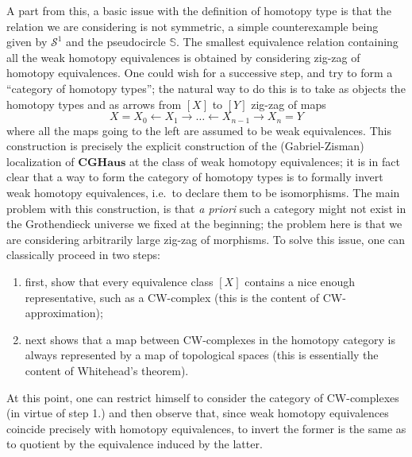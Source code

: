 \begin{refsection}
A part from this, a basic issue with the definition of homotopy type is that the relation we are considering is not symmetric, a simple counterexample being given by $\mathcal{S}^1$ and the pseudocircle $\mathbb S$. The smallest equivalence relation containing all the weak homotopy equivalences is obtained by considering zig-zag of homotopy equivalences. One could wish for a successive step, and try to form a ``category of homotopy types''; the natural way to do this is to take as objects the homotopy types and as arrows from $[X]$ to $[Y]$ zig-zag of maps
\[
X = X_0 \leftarrow X_1 \rightarrow \ldots \leftarrow X_{n-1} \rightarrow X_n = Y
\]
where all the maps going to the left are assumed to be weak equivalences. This construction is precisely the explicit construction of the (Gabriel-Zisman) localization of $\mathbf{CGHaus}$ at the class of weak homotopy equivalences; it is in fact clear that a way to form the category of homotopy types is to formally invert weak homotopy equivalences, i.e.\ to declare them to be isomorphisms. The main problem with this construction, is that \emph{a priori} such a category might not exist in the Grothendieck universe we fixed at the beginning; the problem here is that we are considering arbitrarily large zig-zag of morphisms. To solve this issue, one can classically proceed in two steps:
\begin{enumerate}
\item first, show that every equivalence class $[X]$ contains a nice enough representative, such as a CW-complex (this is the content of CW-approximation);
\item next shows that a map between CW-complexes in the homotopy category is always represented by a map of topological spaces (this is essentially the content of Whitehead's theorem).
\end{enumerate}
At this point, one can restrict himself to consider the category of CW-complexes (in virtue of step 1.) and then observe that, since weak homotopy equivalences coincide precisely with homotopy equivalences, to invert the former is the same as to quotient by the equivalence induced by the latter.


\end{refsection}
